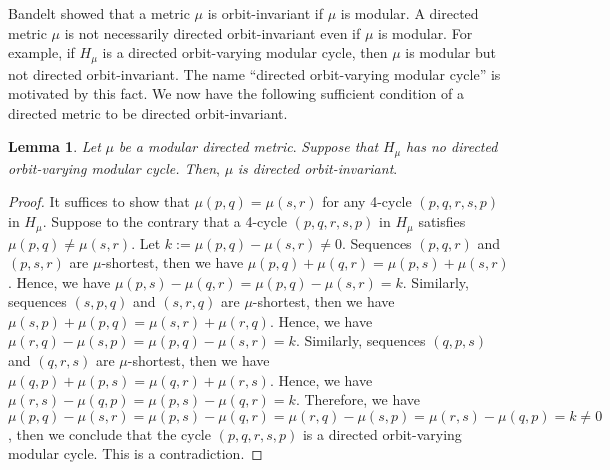 \documentclass[11pt]{article}
\theoremstyle{definition}
\newtheorem{lemma}[theorem]{Lemma}
\begin{document}
Bandelt \cite{bandelt1985} showed that a metric $\mu$ is orbit-invariant if $\mu$ is modular. A directed metric $\mu$ is not necessarily directed orbit-invariant even if $\mu$ is modular. For example, if $H_\mu$ is a directed orbit-varying modular cycle, then $\mu$ is modular but not directed orbit-invariant. The name ``directed orbit-varying modular cycle'' is motivated by this fact. We now have the following sufficient condition of a directed metric to be directed orbit-invariant. 
\begin{lemma}
\label{lem:orbitvariant}
\textit{Let} $\mu$ \textit{be a modular directed metric}. \textit{Suppose that} $H_\mu$ \textit{has no directed orbit-varying modular cycle. Then}, $\mu$ \textit{is directed orbit-invariant}.
\end{lemma}
\begin{proof}
It suffices to show that $\mu(p,q)=\mu(s,r)$ for any 4-cycle $(p,q,r,s,p)$ in $H_\mu$. Suppose to the contrary that a 4-cycle $(p,q,r,s,p)$ in $H_\mu$ satisfies $\mu(p,q)\neq \mu(s,r)$. Let $k:=\mu(p,q)-\mu(s,r)\neq 0$. Sequences $(p,q,r)$ and $(p,s,r)$ are $\mu$-shortest, then we have $\mu(p,q)+\mu(q,r)=\mu(p,s)+\mu(s,r)$. Hence, we have $\mu(p,s)-\mu(q,r)=\mu(p,q)-\mu(s,r)=k$. Similarly, sequences $(s,p,q)$ and $(s,r,q)$ are $\mu$-shortest, then we have $\mu(s,p)+\mu(p,q)=\mu(s,r)+\mu(r,q)$. Hence, we have $\mu(r,q)-\mu(s,p)=\mu(p,q)-\mu(s,r)=k$. Similarly, sequences $(q,p,s)$ and $(q,r,s)$ are $\mu$-shortest, then we have $\mu(q,p)+\mu(p,s)=\mu(q,r)+\mu(r,s)$. Hence, we have $\mu(r,s)-\mu(q,p)=\mu(p,s)-\mu(q,r)=k$. Therefore, we have $\mu(p,q)-\mu(s,r)=\mu(p,s)-\mu(q,r)=\mu(r,q)-\mu(s,p)=\mu(r,s)-\mu(q,p)=k\neq 0$, then we conclude that the cycle $(p,q,r,s,p)$ is a directed orbit-varying modular cycle. This is a contradiction.
\end{proof}
\end{document}
